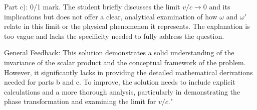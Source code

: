 \documentclass[a4paper,11pt]{article}
\begin{document}
Part c): 0/1 mark. The student briefly discusses the limit \( v/c \rightarrow 0\) and its implications but does not offer a clear, analytical examination of how \( \omega \) and \( \omega' \) relate in this limit or the physical phenomenon it represents. The explanation is too vague and lacks the specificity needed to fully address the question.

General Feedback: This solution demonstrates a solid understanding of the invariance of the scalar product and the conceptual framework of the problem. However, it significantly lacks in providing the detailed mathematical derivations needed for parts b and c. To improve, the solution needs to include explicit calculations and a more thorough analysis, particularly in demonstrating the phase transformation and examining the limit for \( v/c \)."
\end{document}
